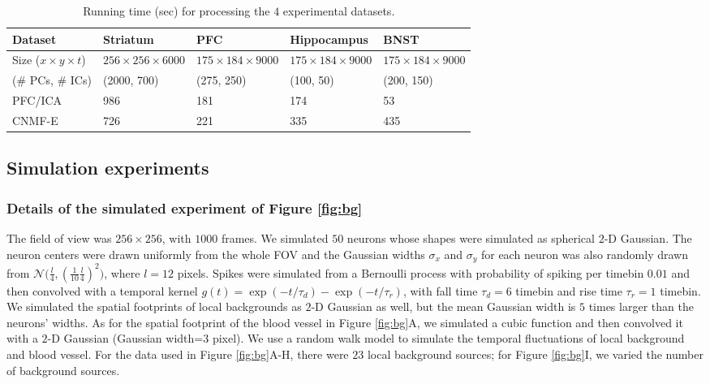 \documentclass[9pt,lineno]{elife}
\begin{document}
\begin{table}[!t]
  \centering
  \begin{tabular}{|L{0.15\textwidth} |L{0.17\textwidth} |L{0.17\textwidth}|L{0.17\textwidth}|L{0.17\textwidth}|} %
    \hline
       Dataset  & Striatum & PFC & Hippocampus & BNST \\
        \hline 
        Size ($x \times y \times t$) & $256\times 256\times 6000$& $175\times 184\times 9000$& $175\times 184\times 9000$ & $175\times 184\times 9000$   \\
        \hline
        (\# PCs, \# ICs) & (2000, 700) & (275, 250)& (100, 50) & (200, 150)   \\
    \hline
    PFC/ICA & 986    &  181    &     174&  53 \\
    \hline
    CNMF-E & 726 & 221 & 335 &  435 \\
    \hline
  \end{tabular} 
\caption{Running time (sec) for processing the $4$ experimental datasets.}
\label{table:running_time}
\end{table}


\subsection{Simulation experiments}
\subsubsection{Details of the simulated experiment of Figure \ref{fig:bg}}
The field of view was $256\times 256$, with $1000$ frames. We simulated $50$ neurons whose shapes were simulated as spherical $2$-D Gaussian. The neuron centers were drawn uniformly from the whole FOV and the Gaussian widths $\sigma_x$ and $\sigma_y$ for each neuron was also randomly drawn from $\mathcal{N}\big(\frac{l}{4}, (\frac{1}{10}\frac{l}{4})^2\big)$, where $l=12$ pixels. Spikes were simulated from a Bernoulli process with probability of spiking per timebin $0.01$ and then convolved with a temporal kernel $g(t)=\exp(-t/\tau_d)-\exp(-t/\tau_r)$, with fall time $\tau_d= 6$ timebin and rise time $\tau_r = 1$ timebin. We simulated the spatial footprints of local backgrounds as $2$-D Gaussian as well, but the mean Gaussian width is $5$ times larger than the neurons' widths. As for the spatial footprint of the blood vessel in Figure \ref{fig:bg}A, we simulated a cubic function and then convolved it with a $2$-D Gaussian (Gaussian width=$3$ pixel). We use a random walk model to simulate the temporal fluctuations of local background and blood vessel. For the data used in Figure \ref{fig:bg}A-H, there were $23$ local background sources; for Figure \ref{fig:bg}I, we varied the number of background sources. 
\end{document}
